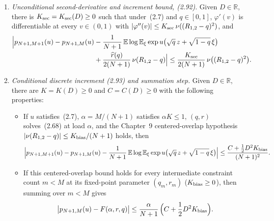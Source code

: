 \begin{proposition}
\begin{enumerate}
\[   (R_{1,2}-q)\,u'(S_v^1)\,u'(S_v^2)\,
   d\bigl((\mu_M(g_0)\otimes\gamma)^{\mathrm{tilted}(u\circ S_v)}\bigr)^{\otimes 2}\right].
\]
\item \emph{Unconditional second-derivative and increment bound, (2.92).} Given $D\in\mathbb R$, there
is $K_{\rm sec}=K_{\rm sec}(D)\ge 0$ such that under~(2.7) and $q\in[0,1]$, $\varphi'(v)$ is
differentiable at every $v\in(0,1)$ with $|\varphi''(v)|\le K_{\rm sec}\,\nu((R_{1,2}-q)^2)$, and
\begin{align*}
 \Bigl|p_{N+1,M+1}(u)-p_{N+1,M}(u)
   &-\frac{1}{N+1}\,\mathbb E\log\mathbb E_\xi\exp u\bigl(\sqrt q\,z+\sqrt{1-q}\,\xi\bigr)\\
   &+\frac{\widehat r(q)}{2(N+1)}\,\nu(R_{1,2}-q)\Bigr|
 \le\frac{K_{\rm sec}}{2(N+1)}\,\nu\bigl((R_{1,2}-q)^2\bigr).
\end{align*}
\item \emph{Conditional discrete increment (2.93) and summation step.} Given $D\in\mathbb R$, there are
$K=K(D)\ge 0$ and $C=C(D)\ge 0$ with the following properties:
\begin{itemize}
\item If $u$ satisfies~(2.7), $\alpha=M/(N+1)$ satisfies $\alpha K\le 1$, $(q,r)$ solves~(2.68) at load
$\alpha$, and the Chapter~9 centered-overlap hypothesis $|\nu(R_{1,2}-q)|\le K_{\rm bias}/(N+1)$ holds,
then
\[
 \Bigl|p_{N+1,M+1}(u)-p_{N+1,M}(u)
   -\frac{1}{N+1}\,\mathbb E\log\mathbb E_\xi\exp u\bigl(\sqrt q\,z+\sqrt{1-q}\,\xi\bigr)\Bigr|
 \le\frac{C+\frac12 D^2 K_{\rm bias}}{(N+1)^2}.
\]
\item If this centered-overlap bound holds for every intermediate constraint count $m<M$ at its
fixed-point parameter $(q_m,r_m)$ ($K_{\rm bias}\ge 0$), then summing over $m<M$ gives
\[
 \bigl|p_{N+1,M}(u)-F(\alpha,r,q)\bigr|
 \le\frac{\alpha}{N+1}\,\Bigl(C+\frac12 D^2 K_{\rm bias}\Bigr).
\]
\end{itemize}
\end{enumerate}
\end{proposition}
